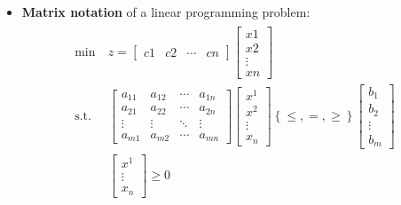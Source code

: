 \documentclass[english]{article}
\begin{document}
\begin{itemize}
  \item \textbf{Matrix notation} of a linear programming problem:
        \begin{gather}
          \begin{aligned}
            \min \         & z = \begin{bmatrix}
                                   c1 & c2 & \cdots & cn
                                 \end{bmatrix}
            \begin{bmatrix}
              x1     \\
              x2     \\
              \vdots \\
              xn
            \end{bmatrix}                                              \\
            \text{s.t.} \  & \begin{bmatrix}
                               a_{11} & a_{12} & \cdots & a_{1n} \\
                               a_{21} & a_{22} & \cdots & a_{2n} \\
                               \vdots & \vdots & \ddots & \vdots \\
                               a_{m1} & a_{m2} & \cdots & a_{mn}
                             \end{bmatrix}
            \begin{bmatrix}
              x^1    \\
              x^2    \\
              \vdots \\
              x_n
            \end{bmatrix} \left\{ \leq, =, \geq \right\} \begin{bmatrix}
                                                           b_1    \\
                                                           b_2    \\
                                                           \vdots \\
                                                           b_m
                                                         \end{bmatrix} \\
                           & \begin{bmatrix}
                               x^1 \\ \vdots \\ x_n
                             \end{bmatrix}
            \geq 0
          \end{aligned}
        \end{gather}
\end{itemize}
\end{document}
